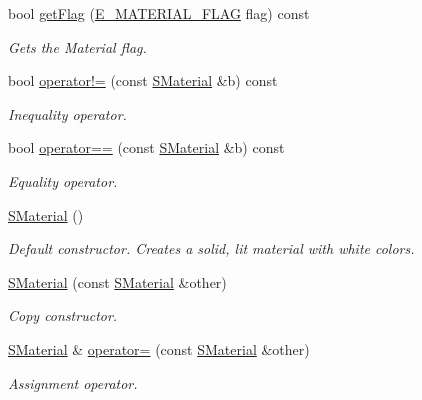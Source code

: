 \begin{DoxyCompactItemize}
bool \hyperlink{classirr_1_1video_1_1SMaterial_a3811e59a69983b4a7fce2d8e7aaf91f1}{get\+Flag} (\hyperlink{namespaceirr_1_1video_a8a3bc00ae8137535b9fbc5f40add70d3}{E\+\_\+\+M\+A\+T\+E\+R\+I\+A\+L\+\_\+\+F\+L\+AG} flag) const
\begin{DoxyCompactList}\small\item\em Gets the Material flag. \end{DoxyCompactList}\item 
bool \hyperlink{classirr_1_1video_1_1SMaterial_aeb4cd5880d7fbf330dc4d5cca0177407}{operator!=} (const \hyperlink{classirr_1_1video_1_1SMaterial}{S\+Material} \&b) const
\begin{DoxyCompactList}\small\item\em Inequality operator. \end{DoxyCompactList}\item 
bool \hyperlink{classirr_1_1video_1_1SMaterial_a32066f6f8ee564be1cabc73de1d0cb6a}{operator==} (const \hyperlink{classirr_1_1video_1_1SMaterial}{S\+Material} \&b) const
\begin{DoxyCompactList}\small\item\em Equality operator. \end{DoxyCompactList}\item 
\mbox{\label{classirr_1_1video_1_1SMaterial_ae5002c3c8ea002539228a9ca95cc8003}} 
\hyperlink{classirr_1_1video_1_1SMaterial_ae5002c3c8ea002539228a9ca95cc8003}{S\+Material} ()
\begin{DoxyCompactList}\small\item\em Default constructor. Creates a solid, lit material with white colors. \end{DoxyCompactList}\item 
\hyperlink{classirr_1_1video_1_1SMaterial_a66f175294b99e3cc2816e9cc0f372ce3}{S\+Material} (const \hyperlink{classirr_1_1video_1_1SMaterial}{S\+Material} \&other)
\begin{DoxyCompactList}\small\item\em Copy constructor. \end{DoxyCompactList}\item 
\hyperlink{classirr_1_1video_1_1SMaterial}{S\+Material} \& \hyperlink{classirr_1_1video_1_1SMaterial_a752ea337daa705d8d7035f0ee93d178d}{operator=} (const \hyperlink{classirr_1_1video_1_1SMaterial}{S\+Material} \&other)
\begin{DoxyCompactList}\small\item\em Assignment operator. \end{DoxyCompactList}\item 

\end{DoxyCompactItemize}
